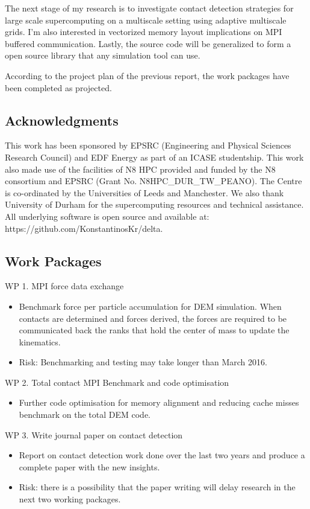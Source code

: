 \documentclass[times,12pt]{article}
\begin{document}
The next stage of my research is to investigate contact detection strategies for large scale supercomputing on a multiscale setting using adaptive multiscale grids. I'm also interested in vectorized memory layout implications on MPI buffered communication. Lastly, the source code will be generalized to form a open source library that any simulation tool can use. 

According to the project plan of the previous report, the work packages have been completed as projected.
 
\subsection{Acknowledgments}
This work has been sponsored by EPSRC (Engineering and Physical Sciences Research Council) and EDF Energy as part of an ICASE studentship. This work also made use of the facilities of N8 HPC provided and funded by the N8 consortium and EPSRC (Grant No. N8HPC{\_}DUR{\_}TW{\_}PEANO). The Centre is co-ordinated by the Universities of Leeds and Manchester. We also thank University of Durham for the supercomputing resources and technical assistance. All underlying software is open source and available at: https://github.com/KonstantinosKr/delta.

\subsection{Work Packages}

WP 1. MPI force data exchange
\begin{itemize}
\item Benchmark force per particle accumulation for DEM simulation. When contacts are determined and forces derived, the forces are required to be communicated back the ranks that hold the center of mass to update the kinematics.
\item Risk: Benchmarking and testing may take longer than March 2016.
\end{itemize}

WP 2. Total contact MPI Benchmark and code optimisation
\begin{itemize}
\item Further code optimisation for memory alignment and reducing cache misses benchmark on the total DEM code.
\end{itemize}

WP 3. Write journal paper on contact detection
\begin{itemize}
\item Report on contact detection work done over the last two years and produce a complete paper with the new insights.
\item Risk: there is a possibility that the paper writing will delay research in the next two working packages.
\end{itemize}
\end{document}
